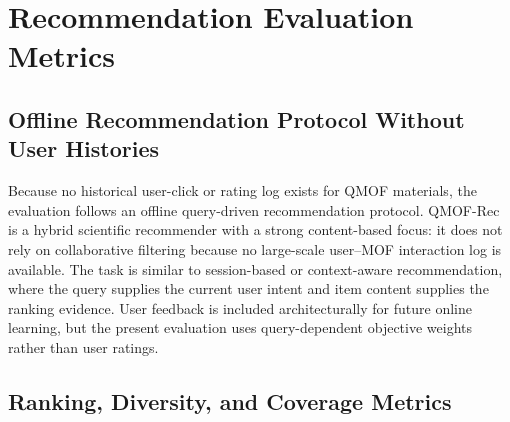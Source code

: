 \documentclass[12pt,a4paper]{article}
\begin{document}
\section{Recommendation Evaluation Metrics}
\label{sec:metrics}

\subsection{Offline Recommendation Protocol Without User Histories}

Because no historical user-click or rating log exists for QMOF materials, the evaluation follows an offline query-driven recommendation protocol. QMOF-Rec is a hybrid scientific recommender with a strong content-based focus: it does not rely on collaborative filtering because no large-scale user--MOF interaction log is available. The task is similar to session-based or context-aware recommendation, where the query supplies the current user intent and item content supplies the ranking evidence. User feedback is included architecturally for future online learning, but the present evaluation uses query-dependent objective weights rather than user ratings.

\subsection{Ranking, Diversity, and Coverage Metrics}
\end{document}
